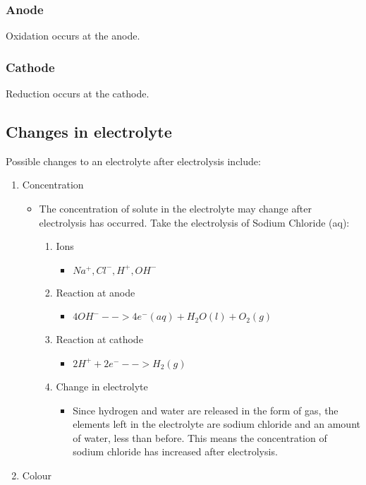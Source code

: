 \documentclass[11pt]{article}
\begin{document}
\subsubsection{Anode}
\label{sec:orgd2adf1d}
Oxidation occurs at the anode.
\subsubsection{Cathode}
\label{sec:org590abf7}
Reduction occurs at the cathode.
\subsection{Changes in electrolyte}
\label{sec:org4a4dd48}
Possible changes to an electrolyte after electrolysis include:
\begin{enumerate}
\item Concentration
\begin{itemize}
\item The concentration of solute in the electrolyte may change after electrolysis has occurred. Take the electrolysis of Sodium Chloride (aq):
\begin{enumerate}
\item Ions
\begin{itemize}
\item \(Na^+, Cl^-, H^+, OH^-\)
\end{itemize}
\item Reaction at anode
\begin{itemize}
\item \(4OH^- --> 4e^- (aq) + H_2O (l) + O_2 (g)\)
\end{itemize}
\item Reaction at cathode
\begin{itemize}
\item \(2H^+ + 2e^- --> H_2 (g)\)
\end{itemize}
\item Change in electrolyte
\begin{itemize}
\item Since hydrogen and water are released in the form of gas, the elements left in the electrolyte are sodium chloride and an amount of water, less than before. This means the concentration of sodium chloride has increased after electrolysis.
\end{itemize}
\end{enumerate}
\end{itemize}
\item Colour
\begin{itemize}

\end{itemize}
\end{enumerate}
\end{document}
